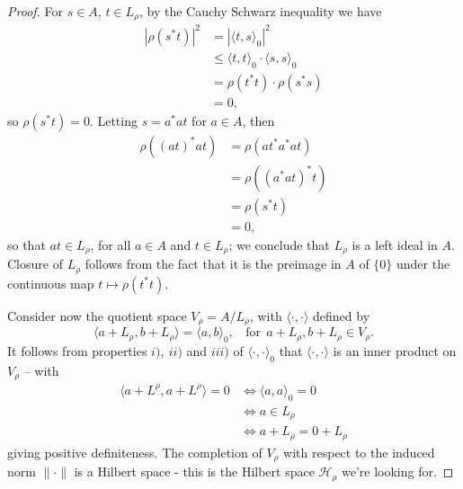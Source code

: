 \documentclass[12pt,a4paper]{report}
\theoremstyle{plain}
\theoremstyle{definition}
\newcommand{\1}{\mathbbm{1}}
\newcommand{\Hr}{\mathcal{H}_\rho}
\begin{document}
\begin{proof}
	For $s \in A$, $t\in L_\rho$, by the Cauchy Schwarz inequality we have 
	\begin{align*}
		|\rho (s^\ast t) |^2 
		&= 		|\langle t,s\rangle_0 |^2 									\\
		&\leq 	\langle t,t\rangle_0 \cdot \langle s,s\rangle_0  			\\
		&= 		\rho (t^\ast t) \cdot \rho (s^\ast s)						\\
		&=		0,
	\end{align*}
	so $\rho (s^\ast t) = 0$. Letting $s = a^\ast a t$ for $a \in A$, then
	\begin{align*}
		\rho ((at)^\ast at) 
		&= 		\rho (at^\ast a^\ast at) 									\\
		&= 		\rho ((a^\ast at)^\ast t) 									\\
		&= 		\rho (s^\ast t) 											\\
		&=		0,
	\end{align*}
	so that $at \in L_\rho$, for all $a \in A$ and $t \in L_\rho$; 
	we conclude that $L_\rho$ is a left ideal in $A$.  Closure  of $L_\rho$ follows from the fact that 
	it is the preimage in $A$ of $\{0\}$ under the continuous map $t \mapsto \rho (t^\ast t)$. 
	
	Consider now the quotient space $V_\rho = A / L_\rho$, with $\langle \cdot,\cdot\rangle$ defined by 
	\[
		\langle a+L_\rho,b+L_\rho \rangle = \langle a,b\rangle_0, ~~~~ 
		\mbox{for}~~a+L_\rho,b+L_\rho \in V_\rho.
	\]
	It follows from properties $i),~ii)$ and $iii)$ of $\langle \cdot,\cdot  \rangle _0$ that
	$\langle \cdot,\cdot  \rangle$ is an inner product on $V_\rho$ -- with
	\begin{align*}
				\langle a + L^\rho, a + L^\rho \rangle = 0
		&\iff 	\langle a,a\rangle_0=0										\\
		&\iff 	a \in L_\rho												\\
		&\iff 	a+L_\rho = 0+L_\rho
	\end{align*}
	giving positive definiteness.
	The completion of $V_\rho$ with respect to the induced norm $\|\cdot\|$ is a Hilbert space -
	this is the Hilbert space $\Hr$ we're looking for.
	

\end{proof}
\end{document}
